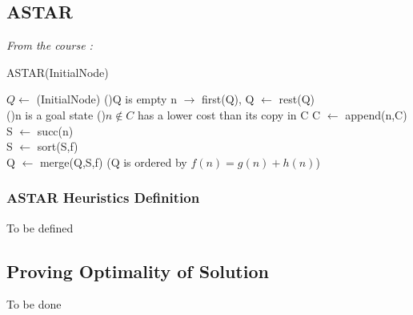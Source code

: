 \documentclass[11pt]{article}
\begin{document}
\subsection{ASTAR}

\emph{From the course : }

\begin{algorithm}[H]
    \caption{ASTAR(InitialNode)}
    \SetAlgoLined
    $Q \leftarrow$ (InitialNode)
    \Repeat(){Q is empty}{
        n $\rightarrow$ first(Q), Q $\leftarrow$ rest(Q) \\
        \If(){n is a goal state}{
        }
        \If(){$n \not \in C$ has a lower cost than its copy in C }{
            C $\leftarrow$ append(n,C)\\
            S $\leftarrow$ succ(n) \\
            S $\leftarrow$ sort(S,f) \\
            Q $\leftarrow$ merge(Q,S,f) (Q is ordered by $f(n) = g(n)+h(n)$)
        }
    }
\end{algorithm}

\subsubsection{ASTAR Heuristics Definition}
To be defined

\subsection{Proving Optimality of Solution}
To be done
\end{document}
